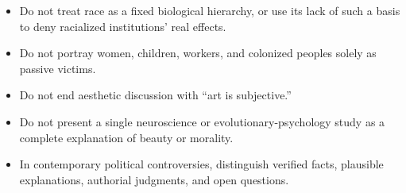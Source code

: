 \begin{itemize}
\item Do not treat race as a fixed biological hierarchy, or use its lack of such a basis to deny racialized institutions' real effects.
\item Do not portray women, children, workers, and colonized peoples solely as passive victims.
\item Do not end aesthetic discussion with ``art is subjective.''
\item Do not present a single neuroscience or evolutionary-psychology study as a complete explanation of beauty or morality.
\item In contemporary political controversies, distinguish verified facts, plausible explanations, authorial judgments, and open questions.
\end{itemize}
